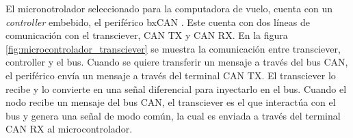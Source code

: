 



El micronotrolador seleccionado para la computadora de vuelo, cuenta con un \textit{controller} embebido, el periférico bxCAN \cite{STM32F746ZG}. Este cuenta con dos líneas de comunicación con el transciever, CAN TX y CAN RX. En la figura \ref{fig:microcontrolador_transciever} se muestra la comunicación entre transciever, controller y el bus. Cuando se quiere transferir un mensaje a través del bus CAN, el periférico envía un mensaje a través del terminal CAN TX. El transciever lo recibe y lo convierte en una señal diferencial para inyectarlo en el bus. Cuando el nodo recibe un mensaje del bus CAN, el transciever es el que interactúa con el bus y genera una señal de modo común, la cual es enviada a través del terminal CAN RX al microcontrolador.

